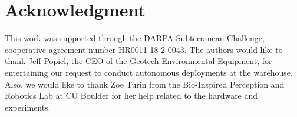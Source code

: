 \documentclass[letterpaper, 10 pt, conference]{ieeeconf}  %
\begin{document}
\section*{Acknowledgment}
This work was supported through the DARPA Subterranean Challenge, cooperative agreement number HR0011-18-2-0043. The authors would like to thank Jeff Popiel, the CEO of the Geotech Environmental Equipment, for entertaining our request to conduct autonomous deployments at the warehouse. Also, we would like to thank Zoe Turin from the Bio-Inspired Perception and Robotics Lab at CU Boulder for her help related to the hardware and experiments. 



\end{document}
